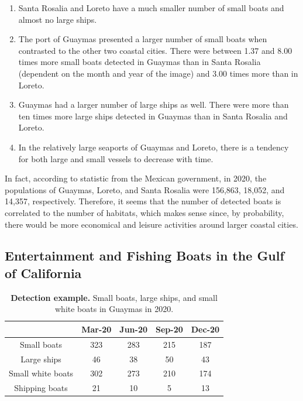 \begin{enumerate}
    \item Santa Rosalia and Loreto have a much smaller number of small boats and almost no large ships.
    \item The port of Guaymas presented a larger number of small boats when contrasted to the other two coastal cities. There were between 1.37 and 8.00 times more small boats detected in Guaymas than in Santa Rosalia (dependent on the month and year of the image) and 3.00 times more than in Loreto. 
    \item Guaymas had a larger number of large ships as well. There were more than ten times more large ships detected in Guaymas than in Santa Rosalia and Loreto.
    \item In the relatively large seaports of Guaymas and Loreto, there is a tendency for both large and small vessels to decrease with time.
\end{enumerate}

In fact, according to statistic\cite{INEGI2022Population} from the Mexican government, in 2020, the populations of Guaymas, Loreto, and Santa Rosalia were 156,863, 18,052, and 14,357, respectively. Therefore, it seems that the number of detected boats is correlated to the number of habitats, which makes sense since, by probability, there would be more economical and leisure activities around larger coastal cities.


\subsection{Entertainment and Fishing Boats in the Gulf of California}



\begin{table}[t]
\center
\begin{tabular}{|c|c|c|c|c|}
\hline
                                &  Mar-20   & Jun-20    & Sep-20    & Dec-20\\ \hline
   Small boats                  &  323      & 283       & 215       & 187   \\ \hline
   Large ships                  &  46       & 38        & 50        & 43    \\ \hline
   Small white boats            &  302      & 273       & 210       & 174   \\ \hline
   Shipping boats               &  21       & 10        & 5         & 13    \\ \hline
\end{tabular}
\caption{\textbf{Detection example.} Small boats, large ships, and small white boats in Guaymas in 2020.}
\label{Guaymas_2020}
\end{table}


